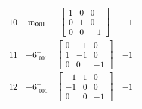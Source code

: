 \documentclass[fleqn,8pt]{jsarticle}
\begin{document}
\begin{longtable}{cccc}
$ 10 $ & $ {\rm m}_{001} $ & $ \begin{bmatrix} 1 & 0 & 0 \\ 0 & 1 & 0 \\ 0 & 0 & -1 \end{bmatrix} $ & $ -1 $ \\ \hline
$ 11 $ & $ -6^{-}_{\,\,001} $ & $ \begin{bmatrix} 0 & -1 & 0 \\ 1 & -1 & 0 \\ 0 & 0 & -1 \end{bmatrix} $ & $ -1 $ \\ \hline
$ 12 $ & $ -6^{+}_{\,\,001} $ & $ \begin{bmatrix} -1 & 1 & 0 \\ -1 & 0 & 0 \\ 0 & 0 & -1 \end{bmatrix} $ & $ -1 $ \\
\end{longtable}
\end{document}
